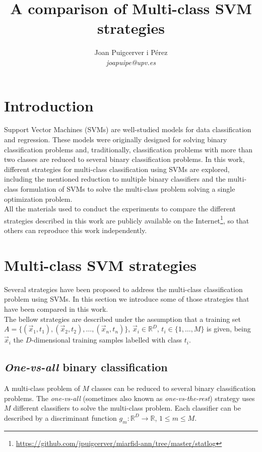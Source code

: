 \documentclass[10pt,a4paper]{article}
\author{Joan Puigcerver i Pérez\\
\emph{joapuipe@upv.es}
}
\title{A comparison of Multi-class SVM strategies}
\begin{document}
\maketitle

\section{Introduction}
Support Vector Machines (SVMs)\cite{cortes1995support} are well-studied models for data classification and regression. These models were originally designed for solving binary classification problems and, traditionally, classification problems with more than two classes are reduced to several binary classification problems. In this work, different strategies for multi-class classification using SVMs are explored, including the mentioned reduction to multiple binary classifiers and the multi-class formulation of SVMs to solve the multi-class problem solving a single optimization problem.\\

All the materials used to conduct the experiments to compare the different strategies described in this work are publicly available on the Internet\footnote{\url{https://github.com/jpuigcerver/miarfid-ann/tree/master/statlog}}, so that others can reproduce this work independently.

\section{Multi-class SVM strategies}
Several strategies have been proposed to address the multi-class classification problem using SVMs. In this section we introduce some of those strategies that have been compared in this work.\\

The bellow strategies are described under the assumption that a training set $A = \{(\vec{x}_1, t_1), (\vec{x}_2, t_2), \ldots, (\vec{x}_n, t_n)\}$, $\vec{x}_i \in \mathbb{R}^D$, $t_i \in \{1, \ldots, M\}$ is given, being $\vec{x}_i$ the $D$-dimensional training samples labelled with class $t_i$.

\subsection{\emph{One-vs-all} binary classification}
A multi-class problem of $M$ classes can be reduced to several binary classification problems. The \emph{one-vs-all} (sometimes also known as \emph{one-vs-the-rest}) strategy uses $M$ different classifiers to solve the multi-class problem. Each classifier can be described by a discriminant function $g_m : \mathbb{R}^D \rightarrow \mathbb{R}$, $1 \leq m \leq M$.\\
\end{document}
